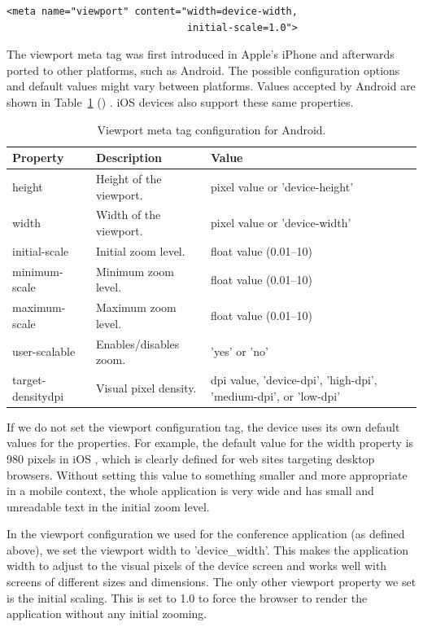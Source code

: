 \begin{verbatim}
<meta name="viewport" content="width=device-width,
                               initial-scale=1.0">
\end{verbatim}

The viewport meta tag was first introduced in Apple's iPhone and
afterwards ported to other platforms, such as Android. The possible
configuration options and default values might vary between
platforms. Values accepted by Android are shown in
Table~\ref{table:viewport-meta} ()
\citationneeded. iOS devices also support these same properties.

\begin{table}
  \begin{tabular}{ l | l | p{5cm} }
    \textbf{Property} & \textbf{Description} & \textbf{Value} \\ \hline
    height & Height of the viewport. & pixel value or 'device-height' \\
    width & Width of the viewport. & pixel value or 'device-width' \\
    initial-scale & Initial zoom level. & float value (0.01--10) \\
    minimum-scale & Minimum zoom level. & float value (0.01--10) \\
    maximum-scale & Maximum zoom level. & float value (0.01--10) \\
    user-scalable & Enables/disables zoom. & 'yes' or 'no' \\
    target-densitydpi & Visual pixel density. & dpi value, 'device-dpi', 'high-dpi', 'medium-dpi', or 'low-dpi' \\
  \end{tabular}
  \label{table:viewport-meta}
  \caption{Viewport meta tag configuration for Android.}
\end{table}

If we do not set the viewport configuration tag, the device uses its
own default values for the properties. For example, the default value
for the width property is 980 pixels in iOS \citationneeded, which is
clearly defined for web sites targeting desktop browsers. Without
setting this value to something smaller and more appropriate in a
mobile context, the whole application is very wide and has small and
unreadable text in the initial zoom level.

In the viewport configuration we used for the conference application
(as defined above), we set the viewport width to 'device\_width'. This
makes the application width to adjust to the visual pixels of the
device screen and works well with screens of different sizes and
dimensions. The only other viewport property we set is the initial
scaling. This is set to 1.0 to force the browser to render the
application without any initial zooming.

